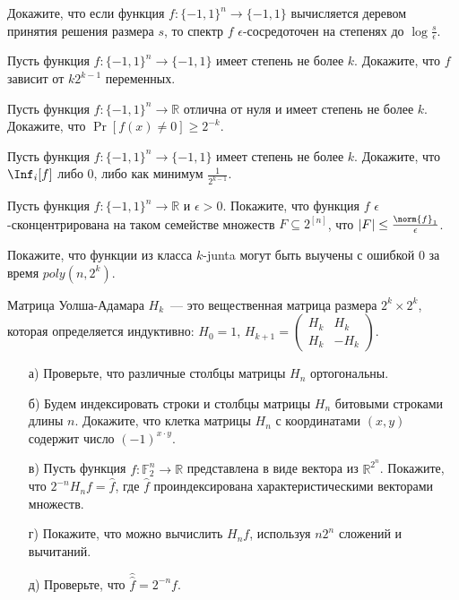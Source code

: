 \begin{task}
    Докажите, что если функция $f: \{-1, 1\}^n \to \{-1, 1\}$ вычисляется деревом принятия решения размера $s$, то спектр $f$
    $\epsilon$-сосредоточен на степенях до $\log{\frac{s}{\epsilon}}$.
\end{task}


\begin{task}
	Пусть функция $f:\{-1, 1\}^n \to \{-1, 1\}$ имеет степень не более $k$. Докажите, что $f$ зависит от $k 2^{k - 1}$
    переменных.
\end{task}


\begin{task}
	Пусть функция $f: \{-1, 1\}^n \to \mathbb{R}$ отлична от нуля и имеет степень не более $k$. Докажите, что $\Pr[f(x) \neq 0]
    \ge 2^{-k}$.
\end{task}


\begin{task}
    Пусть функция $f: \{-1, 1\}^n \to \{-1, 1\}$ имеет степень не более $k$. Докажите, что $\Inf_i[f]$ либо $0$, либо как минимум
    $\frac{1}{2^{k - 1}}$.
\end{task}

\begin{task}
    Пусть функция $f: \{-1, 1\}^n \to \mathbb{R}$ и $\epsilon > 0$. Покажите, что функция $f$ $\epsilon$-сконцентрирована на таком
    семействе множеств $F \subseteq 2^{[n]}$, что $|F| \le \frac{\norm{f}_1}{\epsilon}$.
\end{task}

\begin{task}
    Покажите, что функции из класса $k$-junta могут быть выучены с ошибкой $0$ за время $poly(n, 2^k)$.
\end{task}


\begin{task}
	Матрица Уолша-Адамара $H_k$~--- это вещественная матрица размера $2^k \times 2^k$, которая определяется индуктивно: $H_0 = 1$,
    $H_{k + 1} = \left( \begin{array}{cc} H_k & H_k \\ H_k & -H_k \end{array} \right)$.

    \begin{enumerate}[topsep = 0pt, itemsep = -1ex]
        \item [а)] Проверьте, что различные столбцы матрицы $H_n$ ортогональны.
        \item [б)] Будем индексировать строки и столбцы матрицы $H_n$ битовыми строками длины $n$. Докажите, что клетка матрицы
    		$H_n$ с координатами $(x, y)$ содержит число $(-1)^{x \cdot y}$.
		\item [в)] Пусть функция $f: \mathbb{F}_2^n \to \mathbb{R}$ представлена в виде вектора из $\mathbb{R}^{2^n}$. Покажите,
			что $2^{-n}H_n f = \hat f$, где $\hat f$ проиндексирована характеристическими векторами множеств.
		\item [г)] Покажите, что можно вычислить $H_n f$, используя $n 2^n$ сложений и вычитаний.
		\item [д)] Проверьте, что $\hat {\hat f} = 2^{-n}f$.
	\end{enumerate}
\end{task}


